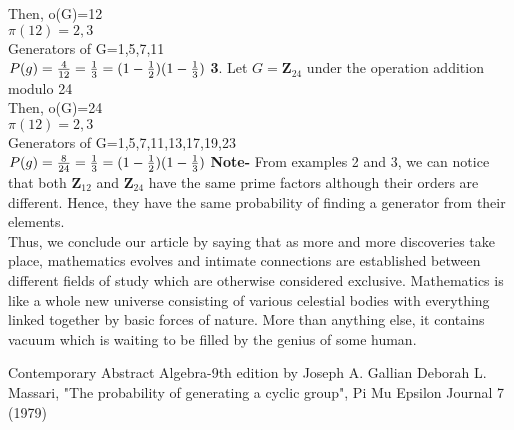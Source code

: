 \documentclass{article}
\begin{document}
Then, o(G)=12\\
$\pi (12)={2,3}$\\
Generators of G={1,5,7,11}\\
$P(g)=\frac{4}{12} = \frac{1}{3} = (1-\frac{1}{2})(1-\frac{1}{3})\\$
\bigbreak
\noindent \textbf{3}. Let $G=\mathbf{Z}_{24}$ under the operation addition modulo 24\\
Then, o(G)=24\\
$\pi (12)={2,3}$\\
Generators of G={1,5,7,11,13,17,19,23}\\
$P(g)=\frac{8}{24} = \frac{1}{3} = (1-\frac{1}{2})(1-\frac{1}{3})\\$
\bigbreak
\noindent \textbf{Note-} From examples 2 and 3, we can notice that both $\mathbf{Z}_{12}$ and $\mathbf{Z}_{24}$ have the same prime factors although their orders are different. Hence, they have the same probability of finding a generator from their elements.\\
\bigbreak
Thus, we conclude our article by saying that as more and more discoveries take place, mathematics evolves and intimate connections are established between different fields of study which are otherwise considered exclusive. Mathematics is like a whole new universe consisting of various celestial bodies with everything linked together by basic forces of nature. More than anything else, it contains vacuum which is waiting to be filled by the genius of some human. 

\newpage
\begin{thebibliography}{2}
 Contemporary Abstract Algebra-9th edition by Joseph A. Gallian
 Deborah L. Massari, "The probability of generating a cyclic group", Pi Mu Epsilon Journal 7 (1979)
\end{thebibliography}
\end{document}
